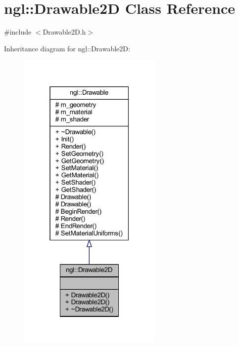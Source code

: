 \hypertarget{classngl_1_1_drawable2_d}{}\section{ngl\+:\+:Drawable2D Class Reference}
\label{classngl_1_1_drawable2_d}


{\ttfamily \#include $<$Drawable2\+D.\+h$>$}



Inheritance diagram for ngl\+:\+:Drawable2D\+:
\nopagebreak
\begin{figure}[H]
\begin{center}
\leavevmode
\includegraphics[width=199pt]{classngl_1_1_drawable2_d__inherit__graph}
\end{center}
\end{figure}


